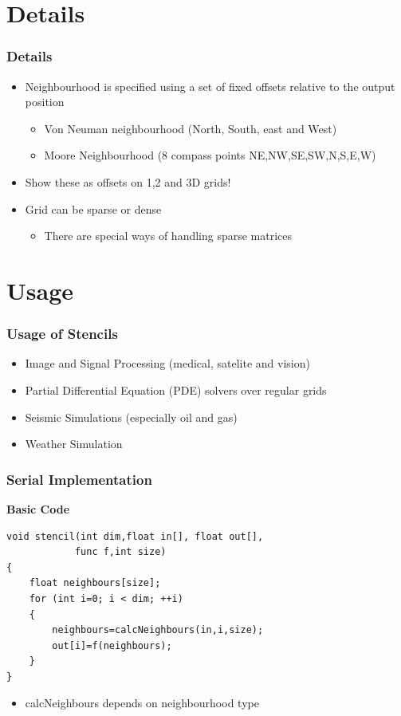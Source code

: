 \documentclass{beamer}
\begin{document}
\section{Details}
\begin{frame}
	\frametitle{Details}
	\begin{itemize}
		\item Neighbourhood is specified using a set of fixed offsets relative to the output position
		\begin{itemize}
			\item Von Neuman neighbourhood (North, South, east and West)
			\item Moore Neighbourhood (8 compass points NE,NW,SE,SW,N,S,E,W)
		\end{itemize}
		\item Show these as offsets on 1,2 and 3D grids!
		\item Grid can be sparse or dense
		\begin{itemize}
			\item There are special ways of handling sparse matrices
		\end{itemize}
	\end{itemize}
\end{frame}

\section{Usage}
\begin{frame}
	\frametitle{Usage of Stencils}
\begin{itemize}
	\item Image and Signal Processing (medical, satelite and vision)
	\item Partial Differential Equation (PDE) solvers over regular grids
	\item Seismic Simulations (especially oil and gas)
	\item Weather Simulation
\end{itemize}

\end{frame}

\begin{frame}[fragile=singleslide]
	\frametitle{Serial Implementation}
\textbf{Basic Code}


\begin{lstlisting}
void stencil(int dim,float in[], float out[],
			func f,int size)
{
	float neighbours[size];
	for (int i=0; i < dim; ++i)
	{
		neighbours=calcNeighbours(in,i,size);
		out[i]=f(neighbours);
	}
}
\end{lstlisting}



\begin{itemize}
	\item calcNeighbours depends on neighbourhood type
\end{itemize}
\end{frame}
\end{document}
